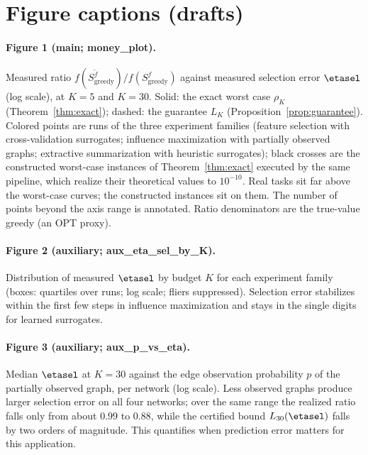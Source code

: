 
\section*{Figure captions (drafts)}

\paragraph{Figure 1 (main; money\_plot).}
Measured ratio $f(S^{\tilde f}_{\mathrm{greedy}})/f(S^{f}_{\mathrm{greedy}})$
against measured selection error $\etasel$ (log scale), at $K=5$ and $K=30$.
Solid: the exact worst case $\rho_K$ (Theorem~\ref{thm:exact}); dashed: the
guarantee $L_K$ (Proposition~\ref{prop:guarantee}).  Colored points are runs of
the three experiment families (feature selection with cross-validation
surrogates; influence maximization with partially observed graphs; extractive
summarization with heuristic surrogates); black crosses are the constructed
worst-case instances of Theorem~\ref{thm:exact} executed by the same
pipeline, which realize their theoretical values to $10^{-10}$.  Real tasks
sit far above the worst-case curves; the constructed instances sit on them.
The number of points beyond the axis range is annotated.  Ratio denominators
are the true-value greedy (an OPT proxy).

\paragraph{Figure 2 (auxiliary; aux\_eta\_sel\_by\_K).}
Distribution of measured $\etasel$ by budget $K$ for each experiment family
(boxes: quartiles over runs; log scale; fliers suppressed).  Selection error
stabilizes within the first few steps in influence maximization and stays in
the single digits for learned surrogates.

\paragraph{Figure 3 (auxiliary; aux\_p\_vs\_eta).}
Median $\etasel$ at $K=30$ against the edge observation probability $p$ of
the partially observed graph, per network (log scale).  Less observed graphs
produce larger selection error on all four networks; over the same range the
realized ratio falls only from about $0.99$ to $0.88$, while the certified
bound $L_{30}(\etasel)$ falls by two orders of magnitude.  This quantifies
when prediction error matters for this application.

